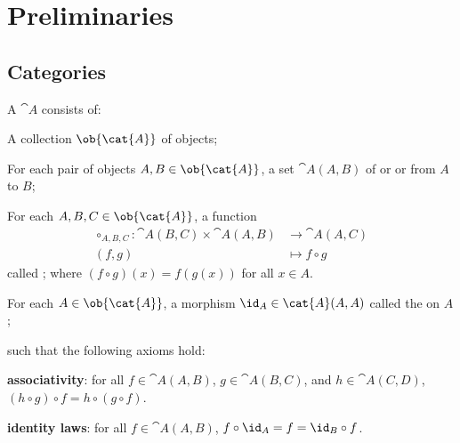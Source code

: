 \section{Preliminaries}








\subsection{Categories}

\begin{definition}
  A  $\cat{A}$ consists of:
  \begin{enumarabic}
    \item A collection $\ob{\cat{A}}$ of objects;
    \item For each pair of objects $A,B\in\ob{\cat{A}}$, a set
      $\cat{A}(A,B)$ of  or 
      or  from $A$ to $B$;
    \item For each $A, B, C \in \ob{\cat{A}}$, a function
      \begin{align*}
        \circ_{A,B,C} : \cat{A}(B,C) \times \cat{A}(A,B) &\to \cat{A}(A,C) \\
        (f,g) &\mapsto f \circ g
      \end{align*}
      called ;
      where $(f \circ g)(x) = f(g(x))$ for all $x \in A$.
    \item For each $A \in \ob{\cat{A}}$, a morphism
      $\id_A \in \cat{A}(A,A)$ called the  on $A$;
  \end{enumarabic}
  such that the following axioms hold:
  \begin{enumarabic}
    \item \textbf{associativity}: for all $f \in \cat{A}(A,B)$,
      $g \in \cat{A}(B,C)$, and $h \in \cat{A}(C,D)$,
      $(h \circ g) \circ f = h \circ (g \circ f)$.
    \item \textbf{identity laws}: for all $f \in \cat{A}(A,B)$,
        $f \circ \id_A = f = \id_B \circ f$.
  \end{enumarabic}
\end{definition}

